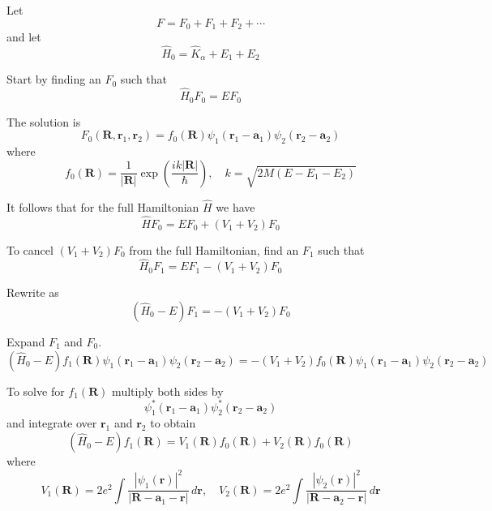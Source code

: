 \documentclass[12pt]{article}
\begin{document}
Let
\begin{equation*}
F=F_0+F_1+F_2+\cdots
\end{equation*}
and let
\begin{equation*}
\hat H_0=\hat K_\alpha+E_1+E_2
\end{equation*}

Start by finding an $F_0$ such that
\begin{equation*}
\hat H_0F_0=EF_0
\end{equation*}

The solution is
\begin{equation*}
F_0(\mathbf R,\mathbf r_1,\mathbf r_2)=f_0(\mathbf R)\psi_1(\mathbf r_1-\mathbf a_1)\psi_2(\mathbf r_2-\mathbf a_2)
\tag{1}
\end{equation*}
where
\begin{equation*}
f_0(\mathbf R)=\frac{1}{|\mathbf R|}\exp\left(\frac{ik|\mathbf R|}{\hbar}\right),\quad k=\sqrt{2M(E-E_1-E_2)}
\end{equation*}

It follows that for the full Hamiltonian $\hat H$ we have
\begin{equation*}
\hat HF_0=EF_0+(V_1+V_2)F_0
\end{equation*}

To cancel $(V_1+V_2)F_0$ from the full Hamiltonian, find an $F_1$ such that
\begin{equation*}
\hat H_0F_1=EF_1-(V_1+V_2)F_0
\end{equation*}

Rewrite as
\begin{equation*}
\left(\hat H_0-E\right)F_1=-(V_1+V_2)F_0
\end{equation*}

Expand $F_1$ and $F_0$.
\begin{equation*}
\left(\hat H_0-E\right)f_1(\mathbf R)\psi_1(\mathbf r_1-\mathbf a_1)\psi_2(\mathbf r_2-\mathbf a_2)
=-(V_1+V_2)f_0(\mathbf R)\psi_1(\mathbf r_1-\mathbf a_1)\psi_2(\mathbf r_2-\mathbf a_2)
\end{equation*}

To solve for $f_1(\mathbf R)$ multiply both sides by
\begin{equation*}
\psi_1^*(\mathbf r_1-\mathbf a_1)\psi_2^*(\mathbf r_2-\mathbf a_2)
\end{equation*}
and integrate over $\mathbf r_1$ and $\mathbf r_2$ to obtain
\begin{equation*}
\left(\hat H_0-E\right)f_1(\mathbf R)
=V_1(\mathbf R)f_0(\mathbf R)+V_2(\mathbf R)f_0(\mathbf R)
\tag{2}
\end{equation*}
where
\begin{equation*}
V_1(\mathbf R)=
2e^2\int\frac{|\psi_1(\mathbf r)|^2}{|\mathbf R-\mathbf a_1-\mathbf r|}\,d\mathbf r,
\quad
V_2(\mathbf R)=
2e^2\int\frac{|\psi_2(\mathbf r)|^2}{|\mathbf R-\mathbf a_2-\mathbf r|}\,d\mathbf r
\end{equation*}
\end{document}

